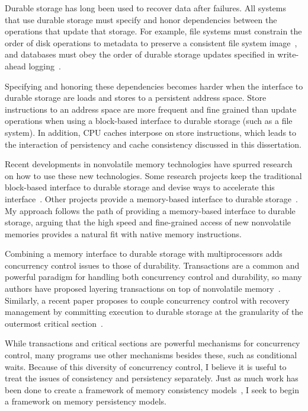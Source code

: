 Durable storage has long been used to recover data after failures.
All systems that use durable storage must specify and honor dependencies between the operations that update that storage.
For example, file systems must constrain the order of disk operations to metadata to preserve a consistent file system image~\cite{Ganger00,Chidambaram13}, and databases must obey the order of durable storage updates specified in write-ahead logging~\cite{MohanHaderle92}.

Specifying and honoring these dependencies becomes harder when the interface to durable storage are loads and stores to a persistent address space.
Store instructions to an address space are more frequent and fine grained than update operations when using a block-based interface to durable storage (such as a file system).
In addition, CPU caches interpose on store instructions, which leads to the interaction of persistency and cache consistency discussed in this dissertation.

Recent developments in nonvolatile memory technologies have spurred research on how to use these new technologies.
Some research projects keep the traditional block-based interface to durable storage and devise ways to accelerate this interface~\cite{CaulfieldDe10}.
Other projects provide a memory-based interface to durable storage~\cite{CoburnCaulfield11}.
My approach follows the path of providing a memory-based interface to durable storage, arguing that the high speed and fine-grained access of new nonvolatile memories provides a natural fit with native memory instructions.

Combining a memory interface to durable storage with multiprocessors adds concurrency control issues to those of durability.
Transactions are a common and powerful paradigm for handling both concurrency control and durability, so many authors have proposed layering transactions on top of nonvolatile memory~\cite{Lowell97,CoburnCaulfield11,VolosTack11,Coburn13}.
Similarly, a recent paper proposes to couple concurrency control with recovery management by committing execution to durable storage at the granularity of the outermost critical section~\cite{Chakrabarti13}.

While transactions and critical sections are powerful mechanisms for concurrency control, many programs use other mechanisms besides these, such as conditional waits.
Because of this diversity of concurrency control, I believe it is useful to treat the issues of consistency and persistency separately.
Just as much work has been done to create a framework of memory consistency models~\cite{Adve96}, I seek to begin a framework on memory persistency models.

